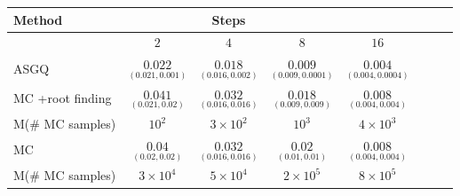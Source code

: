 \FloatBarrier
\begin{table}[h!]
	\centering
	\begin{tabular}{l*{6}{c}r}
		\toprule[1.5pt]
	Method & & Steps  & &     \\
	\hline
           & $2$ & $4$ & $8$ & $16$  \\
		\hline
		ASGQ &  $\underset{(0.021,0.001)}{\mathbf{0.022}}$ & $\underset{(0.016,0.002)}{\mathbf{0.018}}$ & $\underset{(0.009,0.0001)}{\mathbf{0.009}}$ & $\underset{(0.004,0.0004)}{\mathbf{0.004}}$  \\
		
		\hline
			MC +root finding  &  $\underset{(0.021,0.02)}{\mathbf{0.041}}$ & $\underset{(0.016,0.016)}{\mathbf{0.032}}$ & $\underset{(0.009,0.009)}{\mathbf{0.018}}$ & $\underset{(0.004,0.004)}{\mathbf{0.008}}$  \\
			M(\# MC samples)   & $10^2 $  & $3 \times 10^2 $  & $
			10^3$ & $4 \times 10^3$ \\	
		\hline	
				MC   &  $\underset{(0.02,0.02)}{\mathbf{0.04}}$ & $\underset{(0.016,0.016)}{\mathbf{0.032}}$ & $\underset{(0.01,0.01)}{\mathbf{}0.02}$ & $\underset{(0.004,0.004)}{\mathbf{0.008}}$  \\	
				M(\# MC samples)   & $3 \times 10^4$  & $5\times 10^4$  & $2\times 10^5$ & $8\times 10^5$ \\	
		

\end{tabular}
\end{table}
